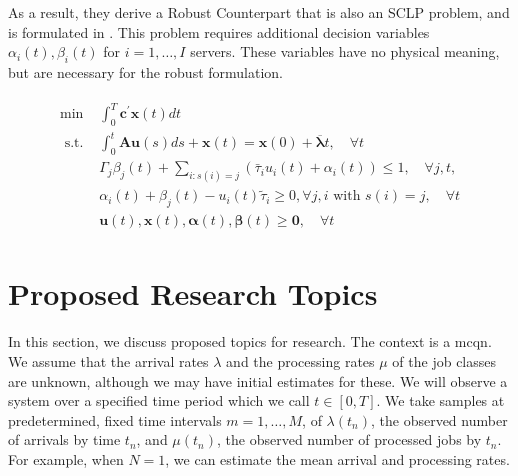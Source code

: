 \documentclass[11pt,a4paper,titlepage]{article}
\theoremstyle{definition}
\theoremstyle{plain}
\begin{document}
    As a result, they derive a Robust Counterpart that is also an SCLP problem,
    and is formulated in .
    This problem requires additional decision variables $\alpha_i(t), \beta_i(t)$
    for $i=1,\ldots,I$ servers.
    These variables have no physical meaning,
    but are necessary for the robust formulation.

    \begin{align}
        \begin{split}
            \label{eq:mcqn-robust-counterpart}
            \min & \int_{0}^{T} \mathbf{c}^{\prime} \mathbf{x}(t) d t \\
            \text { s.t. } & \int_{0}^{t} \mathbf{A} \mathbf{u}(s) d s+\mathbf{x}(t)=\mathbf{x}(0)+\overline{\boldsymbol{\lambda}} t, \quad \forall t \\
            & \Gamma_{j} \beta_{j}(t)+\sum_{i: s(i)=j}\left(\bar{\tau}_{i} u_{i}(t)+\alpha_{i}(t)\right) \leq 1, \quad \forall j, t, \\
            & \alpha_{i}(t)+\beta_{j}(t)-u_{i}(t) \tilde{\tau}_{i} \geq 0, \forall j, i \text { with } s(i)=j, \quad \forall t \\
            & \mathbf{u}(t), \mathbf{x}(t), \boldsymbol{\alpha}(t), \boldsymbol{\beta}(t) \geq \mathbf{0}, \quad \forall t
        \end{split}
    \end{align}



    \section{Proposed Research Topics}
    \label{sec:topics}

    In this section,
    we discuss proposed topics for research.
    The context is a \gls{mcqn}.
    We assume that the arrival rates $\lambda$
    and the processing rates $\mu$ of the job classes are unknown,
    although we may have initial estimates for these.
    We will observe a system over a specified time period which we call $t \in [0,T]$.
    We take samples at predetermined,
    fixed time intervals $m=1,\ldots,M$,
    of $\lambda(t_n)$,
    the observed number of arrivals by time $t_n$,
    and $\mu(t_n)$,
    the observed number of processed jobs by $t_n$.
    For example,
    when $N=1$,
    we can estimate the mean arrival and processing rates.
\end{document}
